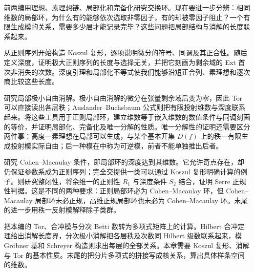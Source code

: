 
\BookPartGuide
前两编用理想、素理想链、局部化和完备化研究交换环。现在要进一步分辨：相同维数的局部环，为什么有的能够依次选取非零因子，有的却被零因子阻止？一个有限生成模的关系，需要多少层才能记录完毕？这些问题把局部结构与消解的长度联系起来。

\ProseParagraphBreak
{}从正则序列开始构造 Koszul 复形，逐项说明微分的符号、同调及其正合性。随后定义深度，证明极大正则序列的长度与选择无关，并把它刻画为剩余域的 Ext 首次非消失的次数。深度引理和局部化不等式使我们能够沿短正合列、素理想和逐次商比较这些长度。

\ProseParagraphBreak
{}研究局部极小自由消解。极小自由消解的微分在张量剩余域后变为零，因此 Tor 可以直接读出各层秩；Auslander–Buchsbaum 公式则把有限投射维数与深度联系起来。将这些工具用于正则局部环，建立维数等于嵌入维数的数值条件与同调刻画的等价，并证明局部化、完备化及唯一分解的性质。唯一分解性的证明还需要区分两件事：高度一素理想在局部可以生成，与某个基本开集 \(D(f)\) 上的秩一有限生成投射模实际自由；后一种模在中称为可逆模，前者不能单独推出后者。

\ProseParagraphBreak
{}研究 Cohen–Macaulay 条件，即局部环的深度达到其维数。它允许奇点存在，却仍保证参数系成为正则序列；完全交提供一类可以通过 Koszul 复形明确计算的例子。则研究整闭性，将余维一的正则性 \(R_1\) 与深度条件 \(S_2\) 结合，证明 Serre 正规性判据。这是不同的两种要求：正则局部环必为 Cohen–Macaulay 环，但 Cohen–Macaulay 局部环未必正规，高维正规局部环也未必为 Cohen–Macaulay 环。末尾的进一步用秩一反射模解释除子类群。

\ProseParagraphBreak
{}把本编的 Tor、合冲模与分次 Betti 数转为多项式矩阵上的计算。Hilbert 合冲定理给出消解长度界，分次极小消解把各层秩及次数同 Hilbert 级数联系起来，模 Gröbner 基和 Schreyer 构造则求出每层的全部关系。本章需要 Koszul 复形、消解与 Tor 的基本性质。末尾的把分片多项式的拼接写成核关系，算出具体样条空间的维数。

